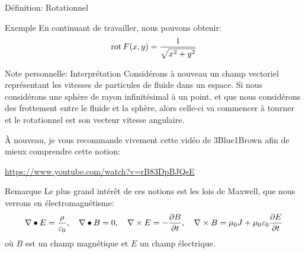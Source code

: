\documentclass[a4paper]{article}
\begin{document}
\begin{parag}{Définition: Rotationnel}
\begin{subparag}{Exemple}
        En continuant de travailler, nous pouvons obtenir: 
        \[\rot F\left(x, y\right) = \frac{1}{\sqrt{x^2 + y^2}}\]
    \end{subparag}

    \begin{subparag}{Note personnelle: Interprétation}
        Considérons à nouveau un champ vectoriel représentant les vitesses de particules de fluide dans un espace. Si nous considérons une sphère de rayon infinitésimal à un point, et que nous considérons des frottement entre le fluide et la sphère, alors celle-ci va commencer à tourner et le rotationnel est son vecteur vitesse angulaire. 

        À nouveau, je vous recommande vivement cette vidéo de 3Blue1Brown afin de mieux comprendre cette notion:
        \begin{center}
            \url{https://www.youtube.com/watch?v=rB83DpBJQsE}
        \end{center}
    \end{subparag}
    
\end{parag}

\begin{parag}{Remarque}
    Le plus grand intérêt de ces notions est les lois de Maxwell, que nous verrons en électromagnétisme:
    \[\nabla \bullet E = \frac{\rho}{\varepsilon_0}, \quad \nabla\bullet B = 0, \quad \nabla \times E = - \frac{\partial B}{\partial t} , \quad \nabla \times B = \mu_0 J + \mu_0 \varepsilon_0 \frac{\partial E}{\partial t} \]
    où $B$ est un champ magnétique et $E$ un champ électrique.
\end{parag}
\end{document}
